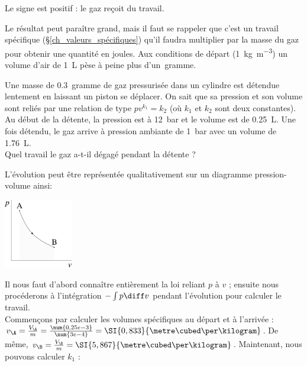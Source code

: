 \begin{anexample}
\begin{answer}
							\begin{remark}Le signe est positif : le gaz reçoit du travail.\end{remark}
							\begin{remark}Le résultat peut paraître grand, mais il faut se rappeler que c’est un travail spécifique (\S\ref{ch_valeurs_spécifiques}) qu’il faudra multiplier par la masse du gaz pour obtenir une quantité en joules. Aux conditions de départ (\SI{1}{\kilogram\per\metre\cubed}) un volume d’air de \SI{1}{\liter} pèse à peine plus d’un~\si{gramme}. \end{remark}
					\end{answer}
			\end{anexample}

			\begin{anexample}
				Une masse de \SI{0,3}{gramme} de gaz pressurisée dans un cylindre est détendue lentement en laissant un piston se déplacer. On sait que sa pression et son volume sont reliés par une relation de type $p v^{k_1} = k_2$ (où $k_1$ et $k_2$ sont deux constantes).\\
				Au début de la détente, la pression est à \SI{12}{\bar} et le volume est de \SI{0,25}{\liter}. Une fois détendu, le gaz arrive à pression ambiante de \SI{1}{\bar} avec un volume de \SI{1,76}{\liter}.\\
				Quel travail le gaz a-t-il dégagé pendant la détente ?				
					\begin{answer}
						L’évolution peut être représentée qualitativement sur un diagramme pression-volume ainsi:
							\begin{center}
								\includegraphics[width=3cm]{images/ex_pv_exp2.png}
							\end{center}
						Il nous faut d’abord connaître entièrement la loi reliant $p$ à $v$ ; ensuite nous procéderons à l’intégration $-\int p \diff v$ pendant l’évolution pour calculer le travail.\\
						Commençons par calculer les volumes spécifiques au départ et à l’arrivée : $v_\A = \frac{V_\A}{m} = \frac{\num{0,25e-3}}{\num{3e-4}} = \SI{0,833}{\metre\cubed\per\kilogram}$. De même, $v_\B = \frac{V_\B }{m} = \SI{5,867}{\metre\cubed\per\kilogram}$.
						Maintenant, nous pouvons calculer $k_1$ :		

\end{answer}
\end{anexample}
